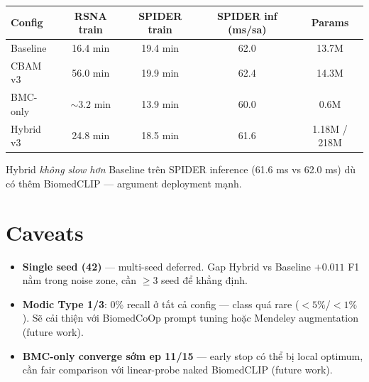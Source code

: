 \documentclass[11pt,a4paper]{article}
\begin{document}
\begin{table}[h]
\centering
\begin{tabular}{@{}lcccc@{}}
\toprule
\rowcolor{tablehdr}
Config & RSNA train & SPIDER train & SPIDER inf (ms/sa) & Params \\
\midrule
Baseline      & 16.4 min & 19.4 min & 62.0 & 13.7M \\
CBAM v3       & 56.0 min & 19.9 min & 62.4 & 14.3M \\
BMC-only      & ${\sim}3.2$ min & 13.9 min & 60.0 & 0.6M  \\
Hybrid v3     & 24.8 min & 18.5 min & 61.6 & 1.18M / 218M \\
\bottomrule
\end{tabular}
\end{table}

\noindent Hybrid \emph{không slow hơn} Baseline trên SPIDER inference
(61.6 ms vs 62.0 ms) dù có thêm BiomedCLIP --- argument deployment
mạnh.

\section{Caveats}

\begin{itemize}
\item \textbf{Single seed (42)} --- multi-seed deferred. Gap Hybrid vs
Baseline $+0.011$ F1 nằm trong noise zone, cần $\geq 3$ seed để
khẳng định.
\item \textbf{Modic Type 1/3}: 0\% recall ở tất cả config --- class
quá rare ($<5\%$/$<1\%$). Sẽ cải thiện với BiomedCoOp prompt tuning
hoặc Mendeley augmentation (future work).
\item \textbf{BMC-only converge sớm ep 11/15} --- early stop có thể bị
local optimum, cần fair comparison với linear-probe naked BiomedCLIP
(future work).
\end{itemize}
\end{document}
